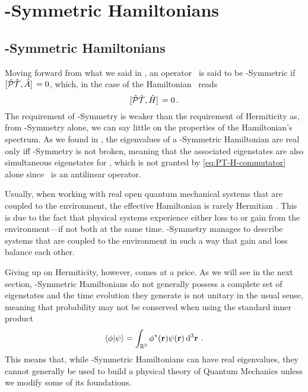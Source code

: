 \chapter{\PT-Symmetric Hamiltonians}\label{ch:pt-symmetric-hamiltonians}
    \section{\PT-Symmetric Hamiltonians}
        Moving forward from what we said in , an operator \hA\ is said to be \PT-Symmetric if $\comm*{\hPT}{\hA} = 0$, which, in the case of the Hamiltonian \hH\ reads
        \begin{equation}
            \label{eq:PT-H-commutator}
            \comm*{\hPT}{\hH} = 0
            \myperiod
        \end{equation}
        The requirement of \PT-Symmetry is weaker than the requirement of Hermiticity as, from \PT-Symmetry alone, we can say little on the properties of the Hamiltonian's spectrum. As we found in , the eigenvalues of a \PT-Symmetric Hamiltonian are real only iff \PT-Symmetry is not broken, meaning that the associated eigenstates are also simultaneous eigenstates for \hPT, which is not granted by \eqref{eq:PT-H-commutator} alone since \hPT\ is an antilinear operator.

        Usually, when working with real open quantum mechanical systems that are coupled to the environment, the effective Hamiltonian is rarely Hermitian \cite{bender2024}. This is due to the fact that physical systems experience either loss to or gain from the environment---if not both at the same time. \PT-Symmetry manages to describe systems that are coupled to the environment in such a way that gain and loss balance each other.

        Giving up on Hermiticity, however, comes at a price. As we will see in the next section, \PT-Symmetric Hamiltonians do not generally possess a complete set of eigenstates and the time evolution they generate is not unitary in the usual sense, meaning that probability may not be conserved when using the standard inner product
        \begin{equation}
            \label{eq:standard-inner-product}
            \braket{\phi}{\psi} = \int\nolimits_{\bbR^3} \phi^*\pqty{\vb{r}} \psi\pqty{\vb{r}} \dd[3]{\vb{r}}
            \myperiod
        \end{equation}
        This means that, while \PT-Symmetric Hamiltonians can have real eigenvalues, they cannot generally be used to build a physical theory of Quantum Mechanics unless we modify some of its foundations.

